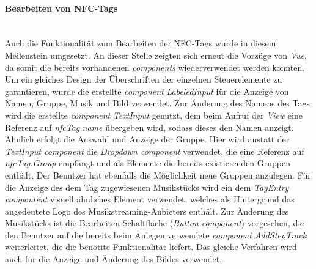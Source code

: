 \documentclass[10pt, a4paper]{article}
\begin{document}
\begin{onehalfspace}
\paragraph*{Bearbeiten von NFC-Tags} $~$ \\
Auch die Funktionalität zum Bearbeiten der NFC-Tags wurde in diesem Meilenstein umgesetzt.
An dieser Stelle zeigten sich erneut die Vorzüge von \textit{Vue}, da somit die bereits vorhandenen \textit{components} wiederverwendet werden konnten.
Um ein gleiches Design der Überschriften der einzelnen Steuerelemente zu garantieren, wurde die erstellte \textit{component} \textit{LabeledInput} für die Anzeige von Namen, Gruppe, Musik und Bild verwendet.
Zur Änderung des Namens des Tags wird die erstellte \textit{component} \textit{TextInput} genutzt, dem beim Aufruf der \textit{View} eine Referenz auf \textit{nfcTag.name} übergeben wird, sodass dieses den Namen anzeigt.
Ähnlich erfolgt die Auswahl und Anzeige der Gruppe. Hier wird anstatt der \textit{TextInput component} die \textit{Dropdown component} verwendet, die eine Referenz auf \textit{nfcTag.Group} empfängt und als Elemente die bereits existierenden Gruppen enthält.
Der Benutzer hat ebenfalls die Möglichkeit neue Gruppen anzulegen.
Für die Anzeige des dem Tag zugewiesenen Musikstücks wird ein dem \textit{TagEntry compontent} visuell ähnliches Element verwendet, welches als Hintergrund das angedeutete Logo des Musikstreaming-Anbieters enthält.
Zur Änderung des Musikstücks ist die Bearbeiten-Schaltfläche (\textit{Button component}) vorgesehen, die den Benutzer auf die bereits beim Anlegen verwendete \textit{component AddStepTrack} weiterleitet, die die benötite Funktionalität liefert.
Das gleiche Verfahren wird auch für die Anzeige und Änderung des Bildes verwendet.


\end{onehalfspace}
\end{document}
